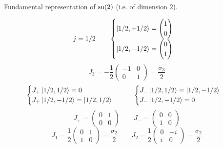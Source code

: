\begin{example}
Fundamental representation of $\operatorname{su}(2)$ (i.e. of dimension $2$).

\[ j=1/2 \qquad \begin{cases}
\left| 1/2,+1/2 \right\rangle = \begin{pmatrix} 1 \\ 0 \end{pmatrix} \\
\left| 1/2,-1/2 \right\rangle = \begin{pmatrix} 0 \\ 1 \end{pmatrix}
\end{cases} \]
\[ J_3 = - \frac{1}{2} \begin{pmatrix}
-1 & 0 \\ 0 & 1
\end{pmatrix} = \frac{\sigma_3}{2} \]
\[ \begin{cases}
J_+\left| 1/2, 1/2 \right\rangle = 0 \\ J_+\left| 1/2, -1/2 \right\rangle = \left| 1/2,1/2 \right\rangle
\end{cases} \qquad \begin{cases}
J_-\left| 1/2, 1/2 \right\rangle = \left| 1/2,-1/2 \right\rangle \\ J_-\left| 1/2, -1/2 \right\rangle = 0
\end{cases} \]
\[J_+ = \begin{pmatrix}
0&1\\0&0
\end{pmatrix} \qquad J_- = \begin{pmatrix}
0&0\\1&0
\end{pmatrix}\]
\[ J_1 = \frac{1}{2}\begin{pmatrix}
0&1\\1&0
\end{pmatrix} = \frac{\sigma_2}{2} \qquad J_2 = \frac{1}{2} \begin{pmatrix}
0&-i\\i&0
\end{pmatrix} = \frac{\sigma_2}{2}\]
\end{example}

